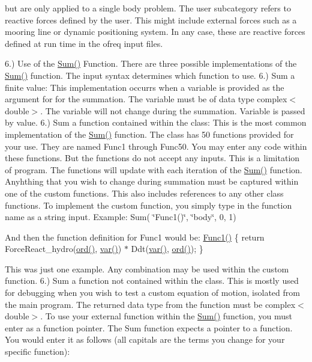 but are only applied to a single body problem. The user subcategory refers to reactive forces defined by the user. This might include external forces such as a mooring line or dynamic positioning system. In any case, these are reactive forces defined at run time in the ofreq input files.

6.) Use of the \hyperlink{classosea_1_1ofreq_1_1_equationof_motion_a5907d782ee639d5ec24515ed21050851}{Sum()} Function. There are three possible implementations of the \hyperlink{classosea_1_1ofreq_1_1_equationof_motion_a5907d782ee639d5ec24515ed21050851}{Sum()} function. The input syntax determines which function to use. 6.) Sum a finite value\-: This implementation occurrs when a variable is provided as the argument for for the summation. The variable must be of data type complex$<$double$>$. The variable will not change during the summation. Variable is passed by value. 6.) Sum a function contained within the class\-: This is the most common implementation of the \hyperlink{classosea_1_1ofreq_1_1_equationof_motion_a5907d782ee639d5ec24515ed21050851}{Sum()} function. The class has 50 functions provided for your use. They are named Func1 through Func50. You may enter any code within these functions. But the functions do not accept any inputs. This is a limitation of program. The functions will update with each iteration of the \hyperlink{classosea_1_1ofreq_1_1_equationof_motion_a5907d782ee639d5ec24515ed21050851}{Sum()} function. Anyhthing that you wish to change during summation must be captured within one of the custom functions. This also includes references to any other class functions. To implement the custom function, you simply type in the function name as a string input. Example\-: Sum( \char`\"{}\-Func1()\char`\"{}, \char`\"{}body\char`\"{}, 0, 1)

And then the function definition for Func1 would be\-: \hyperlink{classosea_1_1ofreq_1_1_eqn_translation_a147be15e86663c1af76ca2ecaeece82d}{Func1()} \{ return Force\-React\-\_\-hydro(\hyperlink{classosea_1_1ofreq_1_1_equationof_motion_a31f904818ce75c9e2a2b5cff9fc707a5}{ord()}, \hyperlink{classosea_1_1ofreq_1_1_equationof_motion_ab69511cc5037376cf7da80ce30d9eaab}{var()}) $\ast$ Ddt(\hyperlink{classosea_1_1ofreq_1_1_equationof_motion_ab69511cc5037376cf7da80ce30d9eaab}{var()}, \hyperlink{classosea_1_1ofreq_1_1_equationof_motion_a31f904818ce75c9e2a2b5cff9fc707a5}{ord()}); \}

This was just one example. Any combination may be used within the custom function. 6.) Sum a function not contained within the class. This is mostly used for debugging when you wish to test a custom equation of motion, isolated from the main program. The returned data type from the function must be complex$<$double$>$. To use your external function within the \hyperlink{classosea_1_1ofreq_1_1_equationof_motion_a5907d782ee639d5ec24515ed21050851}{Sum()} function, you must enter as a function pointer. The Sum function expects a pointer to a function. You would enter it as follows (all capitals are the terms you change for your specific function)\-:

